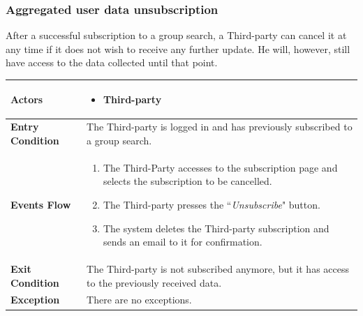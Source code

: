         \subsubsection{Aggregated user data unsubscription}
        After a successful subscription to a group search, a Third-party can cancel it at any time if it does not wish to receive any further update. He will, however, still have access to the data collected until that point.
        
            \begin{table}[H]
            	\centering
                \begin{tabular}{|p{3cm}|p{8.2cm}|}
                    \hline
                    \textbf{Actors} &  \begin{itemize}
                        \item Third-party
                    \end{itemize} \\
                     \hline
                    \textbf{Entry Condition} & The Third-party is logged in and has previously subscribed to a group search. \\
                     \hline
                    \textbf{Events Flow} & \begin{enumerate}
                        \item The Third-Party accesses to the subscription page and selects the subscription to be cancelled.
                        \item The Third-party presses the ``\emph{Unsubscribe}" button.
                        \item The system deletes the Third-party subscription and sends an email to it for confirmation.
                    \end{enumerate} \\
                     \hline
                    \textbf{Exit Condition} & The Third-party is not subscribed anymore, but it has access to the previously received data. \\
                     \hline
                    \textbf{Exception} & There are no exceptions. \\
                     \hline
                \end{tabular}  
            \end{table}        
        
